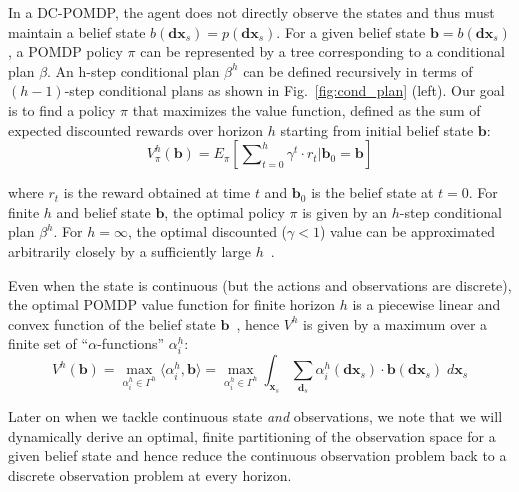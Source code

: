 \documentclass{article} %
\renewcommand{\vec}[1]{\mathbf{#1}} %
\newcommand{\xds}{\mathbf{dx}_s}
\renewcommand{\l}{\langle}
\renewcommand{\r}{\rangle}
\begin{document}
\label{sec:vi}

In a DC-POMDP, the agent does not directly observe the states and thus
must maintain a belief state $b(\xds) = p(\xds)$.  For a
given belief state $\vec{b} = b(\xds)$, a POMDP policy $\pi$ can be
represented by a tree corresponding to a conditional plan $\beta$.  An
h-step conditional plan $\beta^h$ can be defined recursively in terms
of $(h-1)$-step conditional plans as shown in
Fig.~\ref{fig:cond_plan} (left).
Our goal is to find a policy $\pi$ that maximizes the value function,
defined as the sum of expected discounted rewards over horizon $h$
starting from initial belief state $\vec{b}$:
{\footnotesize
\vspace{-1mm}
\begin{equation}
V^h_\pi(\vec{b}) = E_{\pi} \left[ \sum\nolimits_{t=0}^{h} \gamma^t \cdot r_t \Big| \vec{b}_0 = \vec{b} \right]
\end{equation}
\vspace{-4mm}
}

where $r_t$ is the reward obtained at time $t$ and $\vec{b}_0$ is the
belief state at $t=0$.  For finite $h$ and belief state $\vec{b}$, the
optimal policy $\pi$ is given by an $h$-step conditional plan
$\beta^h$.  For $h = \infty$, the optimal discounted ($\gamma < 1$)
value can be approximated arbitrarily closely by 
a sufficiently large $h$~\cite{kaebling}.  

Even when the state is continuous (but the actions and observations
are discrete), 
the optimal POMDP value function for finite horizon $h$ is a piecewise linear and
convex function of the belief state $\vec{b}$~\cite{Perseus_cont}, hence 
$V^h$ is given by a maximum over a finite set of
``$\alpha$-functions'' $\alpha^h_i$:
{\footnotesize 
\vspace{-1mm}
\begin{equation}
V^h(\vec{b}) = \max_{\alpha^h_i \in \Gamma^h} \l \alpha^h_i, \vec{b} \r = \max_{\alpha^h_i \in \Gamma^h} \int_{\vec{x}_s} \sum_{\vec{d}_s} \alpha^h_i(\xds) \cdot \vec{b}(\xds) \; d\vec{x}_s 
\end{equation}
\vspace{-4mm}
}

Later on when we tackle continuous state \emph{and} observations,
we note that we will dynamically derive an optimal, 
finite partitioning of the observation
space for a given belief state and hence reduce the continuous
observation problem back to a discrete observation problem at every
horizon.  
\end{document}
